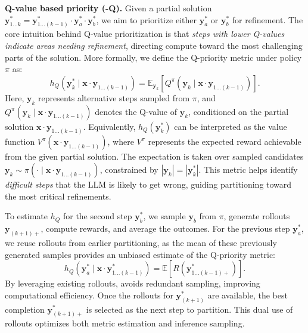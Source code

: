 \textbf{Q-value based priority (\decomp-Q).}  
Given a partial solution $\boldsymbol{y}^*_{1...k} = \boldsymbol{y}^*_{1...(k-1)} \cdot \boldsymbol{y}^*_a \cdot \boldsymbol{y}^*_b$, we aim to prioritize either $\boldsymbol{y}^*_a$ or $\boldsymbol{y}^*_b$ for refinement. 
The core intuition behind Q-value prioritization is that \emph{steps with lower Q-values indicate areas needing refinement}, directing compute toward the most challenging parts of the solution. 
More formally, we define the Q-priority metric under policy $\pi$ as:
\[
h_Q(\boldsymbol{y}^*_k \mid \boldsymbol{x} \cdot \boldsymbol{y}_{1...(k-1)}) = \mathbb{E}_{\boldsymbol{y}_k}\left[ Q^\pi(\boldsymbol{y}_k \mid  \boldsymbol{x} \cdot \boldsymbol{y}_{1...(k-1)}) \right].
\]
Here, $\boldsymbol{y}_k$ represents alternative steps sampled from $\pi$, and $Q^\pi(\boldsymbol{y}_k \mid \boldsymbol{x} \cdot \boldsymbol{y}_{1...(k-1)})$ denotes the Q-value of $\boldsymbol{y}_k$, conditioned on the partial solution $\boldsymbol{x} \cdot \boldsymbol{y}_{1...(k-1)}$. Equivalently, $h_Q(\boldsymbol{y}^*_k)$ can be interpreted as the value function $V^\pi(\boldsymbol{x} \cdot \boldsymbol{y}_{1...(k-1)})$, where $V^\pi$ represents the expected reward achievable from the given partial solution. The expectation is taken over sampled candidates $\boldsymbol{y}_k \sim \pi(\cdot \mid \boldsymbol{x} \cdot \boldsymbol{y}_{1...(k-1)})$, constrained by $|\boldsymbol{y}_k| = |\boldsymbol{y}^*_k|$. This metric helps identify \emph{difficult steps} that the LLM is likely to get wrong, guiding partitioning toward the most critical refinements.

To estimate $h_Q$ for the second step $\boldsymbol{y}^*_b$, we sample $\boldsymbol{y}_{b}$ from $\pi$, generate rollouts $\boldsymbol{y}_{(k+1)+}$, compute rewards, and average the outcomes. For the previous step $\boldsymbol{y}^*_a$, we reuse rollouts from earlier partitioning, as the mean of these previously generated samples provides an unbiased estimate of the Q-priority metric:
\[
h_Q(\boldsymbol{y}^*_a \mid \boldsymbol{x} \cdot \boldsymbol{y}^*_{1...(k-1)}) = \mathbb{E} \left[ R(\boldsymbol{y}^*_{1...(k-1)+}) \right].
\]
By leveraging existing rollouts, \decomp avoids redundant sampling, improving computational efficiency. Once the rollouts for $\boldsymbol{y}^*_{(k+1)}$ are available, the best completion $\boldsymbol{y}^*_{(k+1)+}$ is selected as the next step to partition. This dual use of rollouts optimizes both metric estimation and inference sampling.


